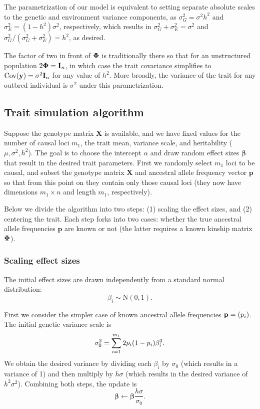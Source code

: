 \documentclass[11pt]{article}
\newcommand{\kinMat}{%
  \ensuremath{%
    \mathbf{\Phi}
  }%
  \xspace%
}%
\begin{document}
The parametrization of our model is equivalent to setting separate absolute scales to the genetic and environment variance components, as $\sigma^2_G = \sigma^2 h^2$ and $\sigma^2_E = (1-h^2) \sigma^2$, respectively, which results in $\sigma^2_G + \sigma^2_E = \sigma^2$ and $\sigma^2_G / (\sigma^2_G + \sigma^2_E) = h^2$, as desired.

The factor of two in front of $\kinMat$ is traditionally there so that for an unstructured population
$2 \kinMat = \mathbf{I}_n$, in which case the trait covariance simplifies to
$\operatorname{Cov}(\mathbf{y}) = \sigma^2 \mathbf{I}_n$ for any value of $h^2$.
More broadly, the variance of the trait for any outbred individual is $\sigma^2$ under this parametrization.

\subsection{Trait simulation algorithm}

Suppose the genotype matrix $\mathbf{X}$ is available, and we have fixed values for the number of causal loci $m_1$, the trait mean, variance scale, and heritability ($\mu, \sigma^2, h^2$).
The goal is to choose the intercept $\alpha$ and draw random effect sizes $\mathbf{\beta}$ that result in the desired trait parameters.
First we randomly select $m_1$ loci to be causal, and subset the genotype matrix $\mathbf{X}$ and ancestral allele frequency vector $\mathbf{p}$ so that from this point on they contain only those causal loci (they now have dimensions $m_1 \times n$ and length $m_1$, respectively).

Below we divide the algorithm into two steps: (1) scaling the effect sizes, and (2) centering the trait.
Each step forks into two cases: whether the true ancestral allele frequencies $\mathbf{p}$ are known or not (the latter requires a known kinship matrix $\kinMat$).

\subsubsection{Scaling effect sizes}

The initial effect sizes are drawn independently from a standard normal distribution:
$$
\beta_i \sim \text{N}(0, 1).
$$

First we consider the simpler case of known ancestral allele frequencies $\mathbf{p} = ( p_i  )$.
The initial genetic variance scale is
$$
\sigma^2_0
=
\sum_{i=1}^{m_1} 2  p_i   (1- p_i  ) \beta_i^2
.
$$
We obtain the desired variance by dividing each $\beta_i$ by $\sigma_0$ (which results in a variance of 1) and then multiply by $h \sigma$ (which results in the desired variance of $h^2 \sigma^2$).
Combining both steps, the update is
$$
\mathbf{\beta}
\leftarrow
\mathbf{\beta} \frac{ h \sigma }{\sigma_0}
.
$$
\end{document}
